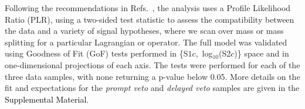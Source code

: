 


Following the recommendations in Refs.~\cite{Cowan_2011:Asymptotic,DM_parameters:BAXTER2021_Conventions}, the analysis uses a Profile Likelihood Ratio (PLR), using a two-sided test statistic to assess the compatibility between the data and a variety of signal hypotheses, where we scan over mass or mass splitting for a particular Lagrangian or operator.
The full model was  validated using Goodness of Fit (GoF) tests performed in \{S$1c$,~log$_{10}$(S2$c$)\} space and in one-dimensional projections of each axis. 
The tests were performed for each of the three data samples, with none returning a p-value below 0.05.
More details on the fit and expectations for the \emph{prompt veto} and \emph{delayed veto} samples are given in the \textcolor{black}{Supplemental Material}. 

